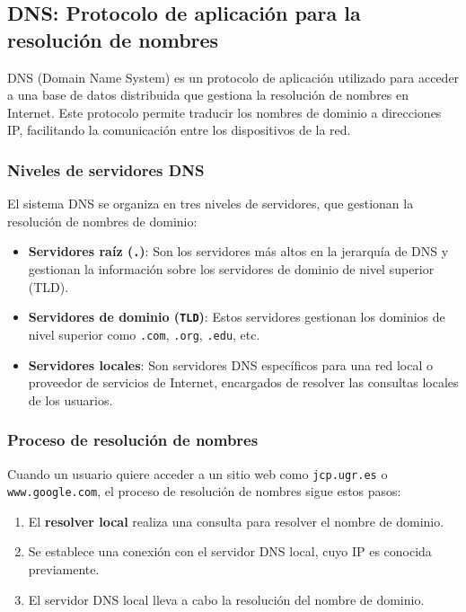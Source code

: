 \documentclass[a4paper,12pt]{article}
\begin{document}
\subsection{DNS: Protocolo de aplicación para la resolución de nombres}

DNS (Domain Name System) es un protocolo de aplicación utilizado para acceder a una base de datos distribuida que gestiona la resolución de nombres en Internet. Este protocolo permite traducir los nombres de dominio a direcciones IP, facilitando la comunicación entre los dispositivos de la red.

\subsubsection{Niveles de servidores DNS}

El sistema DNS se organiza en tres niveles de servidores, que gestionan la resolución de nombres de dominio:

\begin{itemize}
    \item \textbf{Servidores raíz (\texttt{.})}: Son los servidores más altos en la jerarquía de DNS y gestionan la información sobre los servidores de dominio de nivel superior (TLD).
    \item \textbf{Servidores de dominio (\texttt{TLD})}: Estos servidores gestionan los dominios de nivel superior como \texttt{.com}, \texttt{.org}, \texttt{.edu}, etc.
    \item \textbf{Servidores locales}: Son servidores DNS específicos para una red local o proveedor de servicios de Internet, encargados de resolver las consultas locales de los usuarios.
\end{itemize}

\subsubsection{Proceso de resolución de nombres}

Cuando un usuario quiere acceder a un sitio web como \texttt{jcp.ugr.es} o \texttt{www.google.com}, el proceso de resolución de nombres sigue estos pasos:

\begin{enumerate}
    \item El \textbf{resolver local} realiza una consulta para resolver el nombre de dominio.
    \item Se establece una conexión con el servidor DNS local, cuyo IP es conocida previamente.
    \item El servidor DNS local lleva a cabo la resolución del nombre de dominio.
\end{enumerate}
\end{document}
